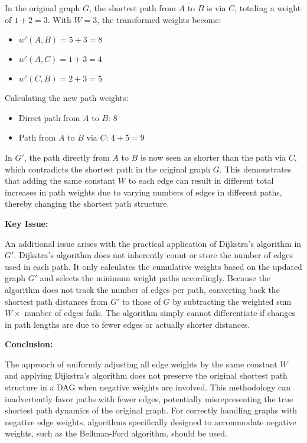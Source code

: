 \documentclass{oxmathproblems}
\begin{document}
\begin{questions}
\begin{itemize}
\end{itemize}

In the original graph \( G \), the shortest path from \( A \) to \( B \) is via \( C \), totaling a weight of \( 1 + 2 = 3 \).
With \( W = 3 \), the transformed weights become:
\begin{itemize}
    \item \( w'(A, B) = 5 + 3 = 8 \)
    \item \( w'(A, C) = 1 + 3 = 4 \)
    \item \( w'(C, B) = 2 + 3 = 5 \)  
\end{itemize}
Calculating the new path weights:
\begin{itemize}
    \item Direct path from \( A \) to \( B \): \( 8 \)
    \item Path from \( A \) to \( B \) via \( C \): \( 4 + 5 = 9 \)
\end{itemize}
In \( G' \), the path directly from \( A \) to \( B \) is now seen as shorter than the path via \( C \), which contradicts the shortest path in the original graph \( G \). This demonstrates that adding the same constant \( W \) to each edge can result in different total increases in path weights due to varying numbers of edges in different paths, thereby changing the shortest path structure.

\textbf{Key Issue:}

An additional issue arises with the practical application of Dijkstra's algorithm in \( G' \). Dijkstra's algorithm does not inherently count or store the number of edges used in each path. It only calculates the cumulative weights based on the updated graph \( G' \) and selects the minimum weight paths accordingly. Because the algorithm does not track the number of edges per path, converting back the shortest path distances from \( G' \) to those of \( G \) by subtracting the weighted sum \( W \times \) number of edges fails. The algorithm simply cannot differentiate if changes in path lengths are due to fewer edges or actually shorter distances.

\textbf{Conclusion:}

The approach of uniformly adjusting all edge weights by the same constant \( W \) and applying Dijkstra’s algorithm does not preserve the original shortest path structure in a DAG when negative weights are involved. This methodology can inadvertently favor paths with fewer edges, potentially misrepresenting the true shortest path dynamics of the original graph. For correctly handling graphs with negative edge weights, algorithms specifically designed to accommodate negative weights, such as the Bellman-Ford algorithm, should be used.


\end{questions}
\end{document}
